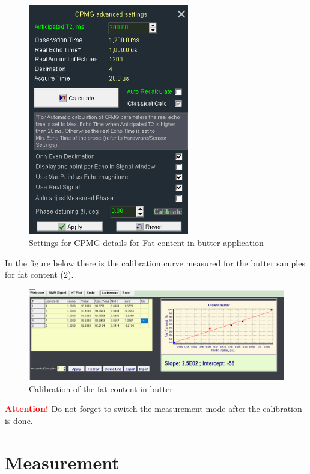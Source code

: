 \documentclass[a4paper,12pt]{article}
\begin{document}
\begin{figure}[H]
\centering
\includegraphics[width=7cm]{CPMG_Oil_Water.png}
\caption{Settings for CPMG details for Fat content in butter application}
\label{fig:CPMG details}
\end{figure}

In the figure below there is the calibration curve measured for the butter samples for fat content (\cref{fig:Calibration fat content in butter}).

\begin{figure}[H]
\centering
\includegraphics[width=17cm]{Calibration_Oil_water.png}
\caption{Calibration of the fat content in butter}
\label{fig:Calibration fat content in butter}
\end{figure}

\textcolor{red}{\textbf{Attention!}} Do not forget to switch the measurement mode after the calibration is done.




\newpage
\section{Measurement}
\label{sec:Measurement}
\end{document}

